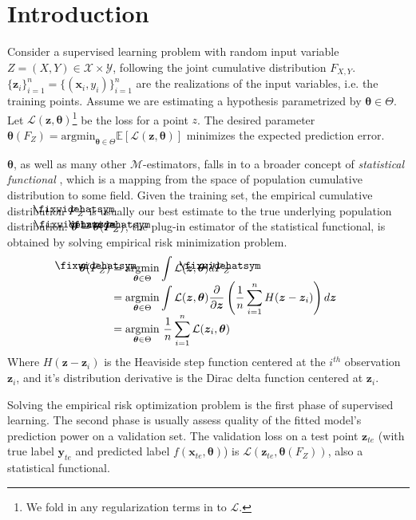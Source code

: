 \documentclass{article}
\newcommand\lowerwidehatsym{%
  \text{\smash{\raisebox{-1.3ex}{%
    $\fixwidehatsym$}}}}
\newcommand\fixwidehat[1]{%
  \mathchoice
    {\accentset{\displaystyle\lowerwidehatsym}{#1}}
    {\accentset{\textstyle\lowerwidehatsym}{#1}}
    {\accentset{\scriptstyle\lowerwidehatsym}{#1}}
    {\accentset{\scriptscriptstyle\lowerwidehatsym}{#1}}
}
\begin{document}
\section{Introduction}
\label{intro}

Consider a supervised learning problem with random input variable $Z=(X,Y)\in \mathcal{X}\times \mathcal{Y}$, following the joint cumulative distribution $F_{X,Y}$. $\{\bm{z}_i\}_{i=1}^n = \{(\bm{x}_i, y_i)\}_{i=1}^n$ are the realizations of the input variables, i.e. the training points. Assume we are estimating a hypothesis parametrized by $\bm{\theta} \in \Theta$. Let $\mathcal{L}(\bm{z}, \bm{\theta})$\footnote{We fold in any regularization terms in to $\mathcal{L}$.} be the loss for a point $z$. The desired parameter $\bm{\theta}(F_Z)=\mathrm{argmin}_{\bm{\theta} \in \Theta}\mathbb{E}\left[\mathcal{L}(\bm{z},\bm{\theta})\right]$ minimizes the expected prediction error. 

$\bm{\theta}$, as well as many other $\mathcal{M}$-estimators, falls in to a broader concept of \textit{statistical functional} \cite{nonp}, which is a mapping from the space of population cumulative distribution to some field. Given the training set, the empirical cumulative distribution $\fixwidehat{F}_Z$ is usually our best estimate to the true underlying population distribution. $\fixwidehat{\bm{\theta}} = \bm{\theta}(\fixwidehat{F}_Z)$, the plug-in estimator of the statistical functional, is obtained by solving empirical risk minimization problem.
\begin{align}\label{emprisk}
	\bm{\theta}(\fixwidehat{F}_Z)&=\underset{\bm{\theta} \in \Theta}{\mathrm{argmin}}\int\mathcal{L}(\bm{z},\bm{\theta})d\fixwidehat{F}_Z \notag\\[-5pt]
	&=\underset{\bm{\theta} \in \Theta}{\mathrm{argmin}}\int\mathcal{L}(\bm{z},	\bm{\theta})\frac{\partial}{\partial \bm{z}}\left(\frac{1}{n}\sum_{i=1}^n H(\bm{z}-\bm{z}_i)\right) d \bm{z}\notag\\[-5pt]
	&=\underset{\bm{\theta} \in \Theta}{\mathrm{argmin}}~\frac{1}{n}\sum_{i=1}^n\mathcal{L}(\bm{z}_i,\bm{\theta})
\end{align}
Where $H(\bm{z}-\bm{z}_i)$ is the Heaviside step function centered at the $i^{th}$ observation $\bm{z}_i$, and it's distribution derivative is the Dirac delta function centered at $\bm{z}_i$. 

Solving the empirical risk optimization problem is the first phase of supervised learning. The second phase is usually assess quality of the fitted model's prediction power on a validation set. The validation loss on a test point $\bm{z}_{te}$ (with true label $\bm{y}_{te}$ and predicted label $f(\bm{x}_{te}, \bm{\theta})$) is $\mathcal{L}(\bm{z}_{te}, \bm{\theta}(F_Z))$, also a statistical functional.
\end{document}
